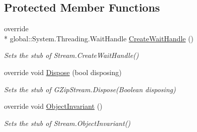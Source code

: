 \subsection*{Protected Member Functions}
\begin{DoxyCompactItemize}
\item 
override \\*
global\-::\-System.\-Threading.\-Wait\-Handle \hyperlink{class_system_1_1_i_o_1_1_compression_1_1_fakes_1_1_stub_g_zip_stream_aa1d7e6fd9b1e0ad963422bac59b38aab}{Create\-Wait\-Handle} ()
\begin{DoxyCompactList}\small\item\em Sets the stub of Stream.\-Create\-Wait\-Handle()\end{DoxyCompactList}\item 
override void \hyperlink{class_system_1_1_i_o_1_1_compression_1_1_fakes_1_1_stub_g_zip_stream_a19acf12ac0849fdf92eebdd7d3ae4247}{Dispose} (bool disposing)
\begin{DoxyCompactList}\small\item\em Sets the stub of G\-Zip\-Stream.\-Dispose(\-Boolean disposing)\end{DoxyCompactList}\item 
override void \hyperlink{class_system_1_1_i_o_1_1_compression_1_1_fakes_1_1_stub_g_zip_stream_a11f0362fa9956d287954a871650906cc}{Object\-Invariant} ()
\begin{DoxyCompactList}\small\item\em Sets the stub of Stream.\-Object\-Invariant()\end{DoxyCompactList}\end{DoxyCompactItemize}
